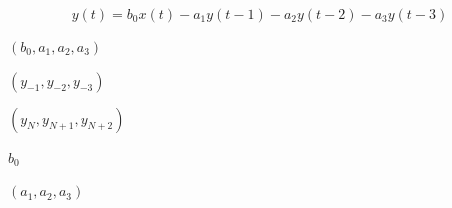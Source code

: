 \documentclass{article}
\begin{document}
\[     y(t) = b_0 x(t) - a_1 y(t-1) - a_2 y(t-2) - a_3 y(t-3)
\]
\pagebreak

$(b_0, a_1, a_2, a_3)$
\pagebreak

$(y_{-1}, y_{-2}, y_{-3})$
\pagebreak

$(y_{N}, y_{N+1}, y_{N+2})$
\pagebreak

$ b_0 $
\pagebreak

$ (a_1, a_2, a_3)$
\pagebreak
\end{document}
